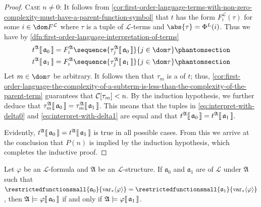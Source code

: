 \begin{proof}
    \vspace{0.3cm}
    \noindent
    {\scshape Case} \( n \neq 0 \):
    It follows from \cref{cor:first-order-language-terms-with-non-zero-complexity-must-have-a-parent-function-symbol} that
    \( t \) has the form \( F^{\mathcal{L}}_{i}(\tau) \) for some \( i \in \dom F^{\mathcal{L}} \) where \( \tau \) is a tuple of \( \mathcal{L} \)-terms
    and \( \abs{\tau} = \Phi^{L}(i) \). Thus we have by \cref{dfn:first-order-language-interpretation-of-terms}
    \begin{align}
        \folterminterpretation{t}{\mathfrak{A}}{\mathfrak{a}_{0}}
        &= F^{\mathfrak{A}}_{i} \sequence{ \folterminterpretation{\tau_{j}}{\mathfrak{A}}{\mathfrak{a}_{0}} }{j \in \dom \tau} \phantomsection \label{eq:interpret-with-delta0}\\
        \folterminterpretation{t}{\mathfrak{A}}{\mathfrak{a}_{1}}
        &= F^{\mathfrak{A}}_{i} \sequence{ \folterminterpretation{\tau_{j}}{\mathfrak{A}}{\mathfrak{a}_{1}} }{j \in \dom \tau} \phantomsection \label{eq:interpret-with-delta1}
    \end{align}
    Let \( m \in \dom \tau \) be arbitrary. It follows then that \( \tau_{m} \) is a  of \( t \); thus,
    \cref{cor:first-order-language-the-complexity-of-a-subterm-is-less-than-the-complexity-of-the-parent-term} guarantees that \( \folcomplexityofterm{\tau_{m}} < n \).
    By the induction hypothesis, we further deduce that
    \( \tau_{m}^{\mathfrak{A}}\llbracket\, \mathfrak{a}_{0} \,\rrbracket = \tau_{m}^{\mathfrak{A}}\llbracket\, \mathfrak{a}_{1} \,\rrbracket \).
    This means that the tuples in \eqref{eq:interpret-with-delta0} and \eqref{eq:interpret-with-delta1} are equal and that
    \( t^{\mathfrak{A}}\llbracket\, \mathfrak{a}_{0} \,\rrbracket = t^{\mathfrak{A}}\llbracket\, \mathfrak{a}_{1} \,\rrbracket \).

    \vspace{0.3cm}
    \noindent
    Evidently, \( t^{\mathfrak{A}}\llbracket\, \mathfrak{a}_{0} \,\rrbracket = t^{\mathfrak{A}}\llbracket\, \mathfrak{a}_{1} \,\rrbracket \) is true in all possible cases.
    From this we arrive at the conclusion that \( P(n) \) is implied by the induction hypothesis, which completes the inductive proof.
\end{proof}

\begin{thm}
     \label{thm:first-order-language-different-variable-assignment-functions-yield-the-same-interpretation-if-they-agree-on-the-free-variables-of-a-formula}
    Let \( \varphi \) be an \( \mathcal{L} \)-formula and \( \mathfrak{A} \) be an \( \mathcal{L} \)-structure.
    If \( \mathfrak{a}_{0} \) and \( \mathfrak{a}_{1} \) are  of \( \mathcal{L} \)
    under \( \mathfrak{A} \) such that \( \restrictedfunctionsmall{\mathfrak{a}_{0}}{\folfreevars{\varphi}} = \restrictedfunctionsmall{\mathfrak{a}_{1}}{\folfreevars{\varphi}} \),
    then \(  \mathfrak{A} \models \varphi\llbracket\, \mathfrak{a}_{0} \,\rrbracket \) if and only if \(  \mathfrak{A} \models \varphi\llbracket\, \mathfrak{a}_{1} \,\rrbracket \).
\end{thm}

